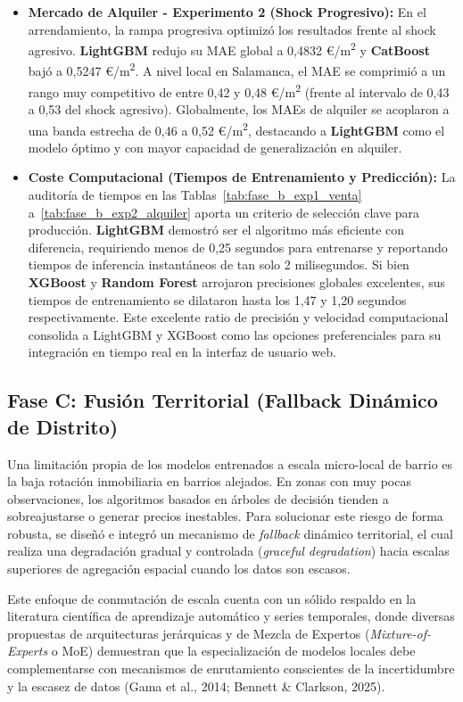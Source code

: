 \documentclass[a4paper,11pt,openany]{book}
\begin{document}
\begin{itemize}
    \item \textbf{Mercado de Alquiler - Experimento 2 (Shock Progresivo):} En el arrendamiento, la rampa progresiva optimizó los resultados frente al shock agresivo. \textbf{LightGBM} redujo su MAE global a 0,4832 €/m\textsuperscript{2} y \textbf{CatBoost} bajó a 0,5247 €/m\textsuperscript{2}. A nivel local en Salamanca, el MAE se comprimió a un rango muy competitivo de entre 0,42 y 0,48 €/m\textsuperscript{2} (frente al intervalo de 0,43 a 0,53 del shock agresivo). Globalmente, los MAEs de alquiler se acoplaron a una banda estrecha de 0,46 a 0,52 €/m\textsuperscript{2}, destacando a \textbf{LightGBM} como el modelo óptimo y con mayor capacidad de generalización en alquiler.
    \item \textbf{Coste Computacional (Tiempos de Entrenamiento y Predicción):} La auditoría de tiempos en las Tablas~\ref{tab:fase_b_exp1_venta} a~\ref{tab:fase_b_exp2_alquiler} aporta un criterio de selección clave para producción. \textbf{LightGBM} demostró ser el algoritmo más eficiente con diferencia, requiriendo menos de 0,25 segundos para entrenarse y reportando tiempos de inferencia instantáneos de tan solo 2 milisegundos. Si bien \textbf{XGBoost} y \textbf{Random Forest} arrojaron precisiones globales excelentes, sus tiempos de entrenamiento se dilataron hasta los 1,47 y 1,20 segundos respectivamente. Este excelente ratio de precisión y velocidad computacional consolida a LightGBM y XGBoost como las opciones preferenciales para su integración en tiempo real en la interfaz de usuario web.
\end{itemize}

\subsection{Fase C: Fusión Territorial (Fallback Dinámico de Distrito)}
Una limitación propia de los modelos entrenados a escala micro-local de barrio es la baja rotación inmobiliaria en barrios alejados. En zonas con muy pocas observaciones, los algoritmos basados en árboles de decisión tienden a sobreajustarse o generar precios inestables. Para solucionar este riesgo de forma robusta, se diseñó e integró un mecanismo de \textit{fallback} dinámico territorial, el cual realiza una degradación gradual y controlada (\textit{graceful degradation}) hacia escalas superiores de agregación espacial cuando los datos son escasos.

Este enfoque de conmutación de escala cuenta con un sólido respaldo en la literatura científica de aprendizaje automático y series temporales, donde diversas propuestas de arquitecturas jerárquicas y de Mezcla de Expertos (\textit{Mixture-of-Experts} o MoE) demuestran que la especialización de modelos locales debe complementarse con mecanismos de enrutamiento conscientes de la incertidumbre y la escasez de datos (Gama et al., 2014; Bennett \& Clarkson, 2025).
\end{document}
